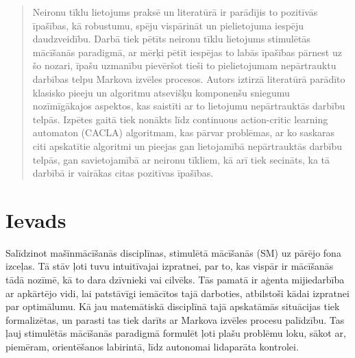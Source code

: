 \documentclass[a0,landscape]{a0poster}
\numberwithin{equation}{section}
\theoremstyle{definition}
\theoremstyle{plain}
\begin{document}
\vspace{1cm} %


\begin{multicols}{5} %


\color{Navy} %

\begin{abstract}

Neironu tīklu lietojums praksē un literatūrā ir parādījis to pozitīvās īpašības, kā robustumu, spēju vispārināt un pielietojuma iespēju daudzveidību.
Darbā tiek pētīts neironu tīklu lietojums stimulētās mācīšanās paradigmā, ar mērķi pētīt iespējas to labās īpašības pārnest uz šo nozari, īpašu uzmanību pievēršot tieši to pielietojumam nepārtrauktu darbības telpu Markova izvēles procesos.
Autors iztirzā literatūrā parādīto klasisko pieeju un algoritmu atsevišķu komponenšu sniegumu nozīmīgākajos aspektos, kas saistīti ar to lietojumu nepārtrauktās darbību telpās.
Izpētes gaitā tiek nonākts līdz continuous action-critic learning automaton (CACLA) algoritmam, kas pārvar problēmas, ar ko saskaras citi apskatītie algoritmi un pieejas gan lietojamībā nepārtrauktās darbību telpās, gan savietojamībā ar neironu tīkliem, kā arī tiek secināts, ka tā darbībā ir vairākas citas pozitīvas īpašības.

\end{abstract}


\color{SaddleBrown} %

\section*{Ievads}

Salīdzinot mašīnmācīšanās disciplīnas, stimulētā mācīšanās (SM) uz pārējo fona izceļas.
Tā stāv ļoti tuvu intuitīvajai izpratnei, par to, kas vispār ir mācīšanās tādā nozīmē, kā to dara dzīvnieki vai cilvēks.
Tās pamatā ir aģenta mijiedarbība ar apkārtējo vidi, lai patstāvīgi iemācītos tajā darboties, atbilstoši kādai izpratnei par optimālumu.
Kā jau matemātiskā disciplīnā tajā apskatāmās situācijas tiek formalizētas, un parasti tas tiek darīts ar Markova izvēles procesu palīdzību.
Tas ļauj stimulētās mācīšanās paradigmā formulēt ļoti plašu problēmu loku, sākot ar, piemēram, orientēšanos labirintā, līdz autonomai lidaparāta kontrolei.


\end{multicols}
\end{document}
